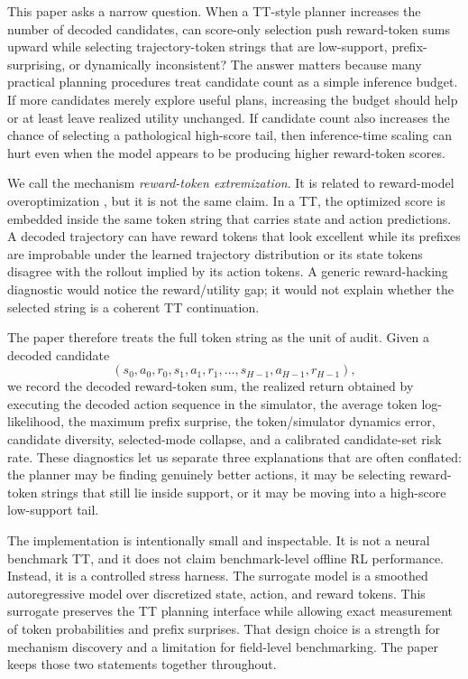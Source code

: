 \documentclass{article}
\begin{document}
This paper asks a narrow question. When a TT-style planner increases the number of decoded candidates, can score-only selection push reward-token sums upward while selecting trajectory-token strings that are low-support, prefix-surprising, or dynamically inconsistent? The answer matters because many practical planning procedures treat candidate count as a simple inference budget. If more candidates merely explore useful plans, increasing the budget should help or at least leave realized utility unchanged. If candidate count also increases the chance of selecting a pathological high-score tail, then inference-time scaling can hurt even when the model appears to be producing higher reward-token scores.

We call the mechanism \emph{reward-token extremization}. It is related to reward-model overoptimization \citep{gao2023scaling}, but it is not the same claim. In a TT, the optimized score is embedded inside the same token string that carries state and action predictions. A decoded trajectory can have reward tokens that look excellent while its prefixes are improbable under the learned trajectory distribution or its state tokens disagree with the rollout implied by its action tokens. A generic reward-hacking diagnostic would notice the reward/utility gap; it would not explain whether the selected string is a coherent TT continuation.

The paper therefore treats the full token string as the unit of audit. Given a decoded candidate
\[
(s_0,a_0,r_0,s_1,a_1,r_1,\ldots,s_{H-1},a_{H-1},r_{H-1}),
\]
we record the decoded reward-token sum, the realized return obtained by executing the decoded action sequence in the simulator, the average token log-likelihood, the maximum prefix surprise, the token/simulator dynamics error, candidate diversity, selected-mode collapse, and a calibrated candidate-set risk rate. These diagnostics let us separate three explanations that are often conflated: the planner may be finding genuinely better actions, it may be selecting reward-token strings that still lie inside support, or it may be moving into a high-score low-support tail.

The implementation is intentionally small and inspectable. It is not a neural benchmark TT, and it does not claim benchmark-level offline RL performance. Instead, it is a controlled stress harness. The surrogate model is a smoothed autoregressive model over discretized state, action, and reward tokens. This surrogate preserves the TT planning interface while allowing exact measurement of token probabilities and prefix surprises. That design choice is a strength for mechanism discovery and a limitation for field-level benchmarking. The paper keeps those two statements together throughout.
\end{document}
